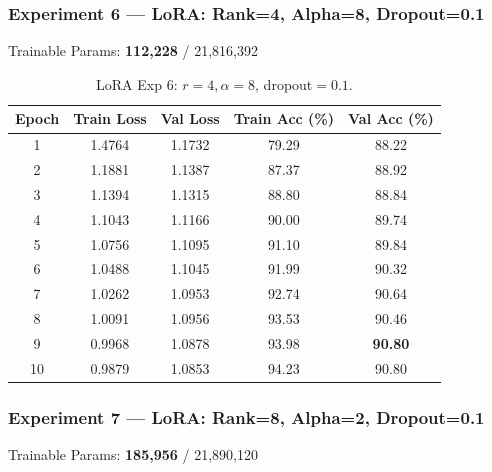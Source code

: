 \documentclass[11pt,a4paper]{article}
\begin{document}
\subsubsection*{Experiment 6 — LoRA: Rank=4, Alpha=8, Dropout=0.1}
\begin{center}
\small Trainable Params: \textbf{112,228} / 21,816,392
\end{center}

\begin{table}[H]
\centering
\begin{tabular}{@{}ccccc@{}}
\toprule
\textbf{Epoch} & \textbf{Train Loss} & \textbf{Val Loss} & \textbf{Train Acc (\%)} & \textbf{Val Acc (\%)} \\
\midrule
1  & 1.4764 & 1.1732 & 79.29 & 88.22 \\
2  & 1.1881 & 1.1387 & 87.37 & 88.92 \\
3  & 1.1394 & 1.1315 & 88.80 & 88.84 \\
4  & 1.1043 & 1.1166 & 90.00 & 89.74 \\
5  & 1.0756 & 1.1095 & 91.10 & 89.84 \\
6  & 1.0488 & 1.1045 & 91.99 & 90.32 \\
7  & 1.0262 & 1.0953 & 92.74 & 90.64 \\
8  & 1.0091 & 1.0956 & 93.53 & 90.46 \\
9  & 0.9968 & 1.0878 & 93.98 & \textbf{90.80} \\
10 & 0.9879 & 1.0853 & 94.23 & 90.80 \\
\bottomrule
\end{tabular}
\caption{LoRA Exp 6: $r=4, \alpha=8$, dropout$=0.1$.}
\end{table}

\subsubsection*{Experiment 7 — LoRA: Rank=8, Alpha=2, Dropout=0.1}
\begin{center}
\small Trainable Params: \textbf{185,956} / 21,890,120
\end{center}
\end{document}
